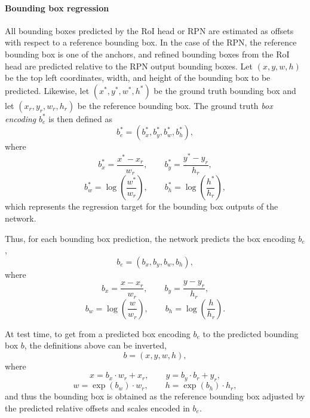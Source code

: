 \label{ssec:rcnn_techn}
\paragraph{Bounding box regression}
All bounding boxes predicted by the RoI head or RPN are estimated as offsets
with respect to a reference bounding box. In the case of the RPN,
the reference bounding box is one of the anchors, and refined bounding boxes from the RoI head are
predicted relative to the RPN output bounding boxes.
Let $(x, y, w, h)$ be the top left coordinates, width, and height of the bounding box
to be predicted. Likewise, let $(x^*, y^*, w^*, h^*)$ be the ground truth bounding
box and let $(x_r, y_r, w_r, h_r)$ be the reference bounding box.
The ground truth \emph{box encoding} $b_e^*$ is then defined as
\begin{equation}
b_e^* = (b_x^*, b_y^*, b_w^*, b_h^*),
\end{equation}
where
\begin{equation*}
b_x^* = \frac{x^* - x_r}{w_r},
\qquad
b_y^* = \frac{y^* - y_r}{h_r},
\end{equation*}
\begin{equation*}
b_w^* = \log \left( \frac{w^*}{w_r} \right),
\qquad
b_h^* = \log \left( \frac{h^*}{h_r} \right),
\end{equation*}
which represents the regression target for the bounding box
outputs of the network.

Thus, for each bounding box prediction, the network predicts the box encoding $b_e$,
\begin{equation}
b_e = (b_x, b_y, b_w, b_h),
\end{equation}
where
\begin{equation*}
b_x = \frac{x - x_r}{w_r},
\qquad
b_y = \frac{y - y_r}{h_r},
\end{equation*}
\begin{equation*}
b_w = \log \left( \frac{w}{w_r} \right),
\qquad
b_h = \log \left( \frac{h}{h_r} \right).
\end{equation*}

At test time, to get from a predicted box encoding $b_e$ to the predicted bounding box $b$,
the definitions above can be inverted,
\begin{equation}
b = (x, y, w, h),
\label{eq:pred_bounding_box}
\end{equation}
where
\begin{equation*}
x = b_x \cdot w_r + x_r,
\qquad
y = b_y \cdot b_r + y_r,
\end{equation*}
\begin{equation*}
w = \exp(b_w) \cdot w_r,
\qquad
h = \exp(b_h) \cdot h_r,
\end{equation*}
and thus the bounding box is obtained as the reference bounding box adjusted by
the predicted relative offsets and scales encoded in $b_e$.

